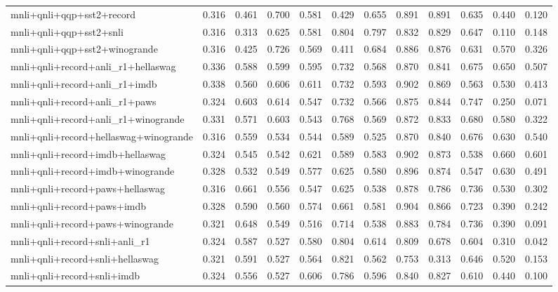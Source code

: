 \begin{table}[t]
\begin{tabular}{lrrrrrrrrrrr}
    mnli+qnli+qqp+sst2+record & 0.316 & 0.461 & 0.700 & 0.581 & 0.429 & 0.655 & 0.891 & 0.891 & 0.635 & 0.440 & 0.120 \\
    mnli+qnli+qqp+sst2+snli & 0.316 & 0.313 & 0.625 & 0.581 & 0.804 & 0.797 & 0.832 & 0.829 & 0.647 & 0.110 & 0.148 \\
    mnli+qnli+qqp+sst2+winogrande & 0.316 & 0.425 & 0.726 & 0.569 & 0.411 & 0.684 & 0.886 & 0.876 & 0.631 & 0.570 & 0.326 \\
    mnli+qnli+record+anli\_r1+hellaswag & 0.336 & 0.588 & 0.599 & 0.595 & 0.732 & 0.568 & 0.870 & 0.841 & 0.675 & 0.650 & 0.507 \\
    mnli+qnli+record+anli\_r1+imdb & 0.338 & 0.560 & 0.606 & 0.611 & 0.732 & 0.593 & 0.902 & 0.869 & 0.563 & 0.530 & 0.413 \\
    mnli+qnli+record+anli\_r1+paws & 0.324 & 0.603 & 0.614 & 0.547 & 0.732 & 0.566 & 0.875 & 0.844 & 0.747 & 0.250 & 0.071 \\
    mnli+qnli+record+anli\_r1+winogrande & 0.331 & 0.571 & 0.603 & 0.543 & 0.768 & 0.569 & 0.872 & 0.833 & 0.680 & 0.580 & 0.322 \\
    mnli+qnli+record+hellaswag+winogrande & 0.316 & 0.559 & 0.534 & 0.544 & 0.589 & 0.525 & 0.870 & 0.840 & 0.676 & 0.630 & 0.540 \\
    mnli+qnli+record+imdb+hellaswag & 0.324 & 0.545 & 0.542 & 0.621 & 0.589 & 0.583 & 0.902 & 0.873 & 0.538 & 0.660 & 0.601 \\
    mnli+qnli+record+imdb+winogrande & 0.328 & 0.532 & 0.549 & 0.577 & 0.625 & 0.580 & 0.896 & 0.874 & 0.547 & 0.630 & 0.491 \\
    mnli+qnli+record+paws+hellaswag & 0.316 & 0.661 & 0.556 & 0.547 & 0.625 & 0.538 & 0.878 & 0.786 & 0.736 & 0.530 & 0.302 \\
    mnli+qnli+record+paws+imdb & 0.328 & 0.590 & 0.560 & 0.574 & 0.661 & 0.581 & 0.904 & 0.866 & 0.723 & 0.390 & 0.242 \\
    mnli+qnli+record+paws+winogrande & 0.321 & 0.648 & 0.549 & 0.516 & 0.714 & 0.538 & 0.883 & 0.784 & 0.736 & 0.390 & 0.091 \\
    mnli+qnli+record+snli+anli\_r1 & 0.324 & 0.587 & 0.527 & 0.580 & 0.804 & 0.614 & 0.809 & 0.678 & 0.604 & 0.310 & 0.042 \\
    mnli+qnli+record+snli+hellaswag & 0.321 & 0.591 & 0.527 & 0.564 & 0.821 & 0.562 & 0.753 & 0.313 & 0.646 & 0.520 & 0.153 \\
    mnli+qnli+record+snli+imdb & 0.324 & 0.556 & 0.527 & 0.606 & 0.786 & 0.596 & 0.840 & 0.827 & 0.610 & 0.440 & 0.100 \\

\end{tabular}
\end{table}

